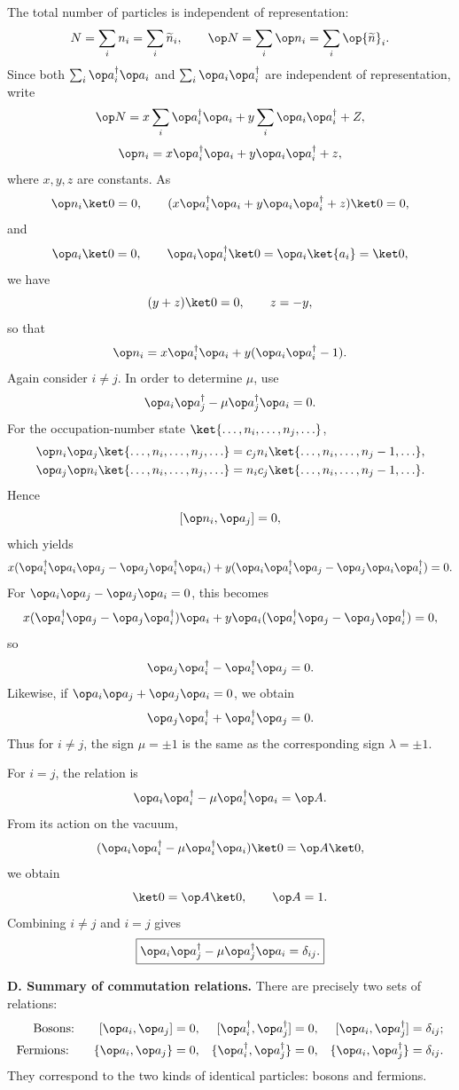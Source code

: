 The total number of particles is independent of representation:
\[N=\sum_i n_i=\sum_i\widetilde n_i,\qquad
\op N=\sum_i\op n_i=\sum_i\op{\widetilde n}_i.\]
Since both $\sum_i\op a_i^\dagger\op a_i$ and $\sum_i\op a_i\op a_i^\dagger$ are independent of representation, write
\[\op N=x\sum_i\op a_i^\dagger\op a_i
+y\sum_i\op a_i\op a_i^\dagger+Z,\]
\[\op n_i=x\op a_i^\dagger\op a_i+y\op a_i\op a_i^\dagger+z,\]
where $x,y,z$ are constants. As
\[\op n_i\ket0=0,\qquad
(x\op a_i^\dagger\op a_i+y\op a_i\op a_i^\dagger+z)\ket0=0,\]
and
\[\op a_i\ket0=0,\qquad
\op a_i\op a_i^\dagger\ket0=\op a_i\ket{a_i}=\ket0,\]
we have
\[(y+z)\ket0=0,\qquad z=-y,\]
so that
\[\op n_i=x\op a_i^\dagger\op a_i+y(\op a_i\op a_i^\dagger-1).\]
Again consider $i\ne j$. In order to determine $\mu$, use
\[\op a_i\op a_j^\dagger-\mu\op a_j^\dagger\op a_i=0.\]
For the occupation-number state $\ket{\ldots,n_i,\ldots,n_j,\ldots}$,
\begin{align*}
\op n_i\op a_j\ket{\ldots,n_i,\ldots,n_j,\ldots}
&=c_j n_i\ket{\ldots,n_i,\ldots,n_j-1,\ldots},\\
\op a_j\op n_i\ket{\ldots,n_i,\ldots,n_j,\ldots}
&=n_ic_j\ket{\ldots,n_i,\ldots,n_j-1,\ldots}.
\end{align*}
Hence
\[[\op n_i,\op a_j]=0,\]
which yields
\[x(\op a_i^\dagger\op a_i\op a_j-\op a_j\op a_i^\dagger\op a_i)
+y(\op a_i\op a_i^\dagger\op a_j-\op a_j\op a_i\op a_i^\dagger)=0.\]
For $\op a_i\op a_j-\op a_j\op a_i=0$, this becomes
\[x(\op a_i^\dagger\op a_j-\op a_j\op a_i^\dagger)\op a_i
+y\op a_i(\op a_i^\dagger\op a_j-\op a_j\op a_i^\dagger)=0,\]
so
\[\op a_j\op a_i^\dagger-\op a_i^\dagger\op a_j=0.\]
Likewise, if $\op a_i\op a_j+\op a_j\op a_i=0$, we obtain
\[\op a_j\op a_i^\dagger+\op a_i^\dagger\op a_j=0.\]
Thus for $i\ne j$, the sign $\mu=\pm1$ is the same as the corresponding sign $\lambda=\pm1$.

For $i=j$, the relation is
\[\op a_i\op a_i^\dagger-\mu\op a_i^\dagger\op a_i=\op A.\]
From its action on the vacuum,
\[(\op a_i\op a_i^\dagger-\mu\op a_i^\dagger\op a_i)\ket0=\op A\ket0,\]
we obtain
\[\ket0=\op A\ket0,\qquad\op A=1.\]
Combining $i\ne j$ and $i=j$ gives
\[\boxed{\op a_i\op a_j^\dagger-\mu\op a_j^\dagger\op a_i=\delta_{ij}.}\]

\textbf{D. Summary of commutation relations.}
There are precisely two sets of relations:
\begin{align*}
\text{Bosons:}\qquad
[\op a_i,\op a_j]&=0,&
[\op a_i^\dagger,\op a_j^\dagger]&=0,&
[\op a_i,\op a_j^\dagger]&=\delta_{ij};\\
\text{Fermions:}\qquad
\{\op a_i,\op a_j\}&=0,&
\{\op a_i^\dagger,\op a_j^\dagger\}&=0,&
\{\op a_i,\op a_j^\dagger\}&=\delta_{ij}.
\end{align*}
They correspond to the two kinds of identical particles: bosons and fermions.

